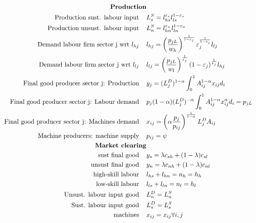 \begin{align}
\text{\textbf{Production}}& \nonumber \\
\text{Production sust. labour input} \hspace{4mm}& L_s^S =l_{hs}^{\varepsilon_s}l_{ls}^{1-\varepsilon_s}\\ 
\text{Production unsust. labour input} \hspace{4mm}& L_n^S =l_{hn}^{\varepsilon_n}l_{ln}^{1-\varepsilon_n}\\
\text{Demand labour firm sector j wrt } l_{hj}\hspace{4mm}&l_{hj}= \left(\frac{p_{jL}}{w_h}\right)^{\frac{1}{1-\varepsilon_j}}\varepsilon_j^{\frac{1}{1-\varepsilon_j}}l_{lj}\\
\text{Demand labour firm sector j wrt } l_{lj}\hspace{4mm}&
l_{lj}= \left(\frac{p_{jL}}{w_l}\right)^\frac{1}{\varepsilon_j}(1-\varepsilon_j)^\frac{1}{\varepsilon_j}l_{hj}\\
\text{Final good producer sector j: Production}\hspace{4mm}&y_j=(L_j^D)^{1-\alpha}\int_{0}^{1}A_{ij}^{1-\alpha}x_{ij}d_i\\
\text{Final good producer sector j: Labour demand}\hspace{4mm}&
p_j(1-\alpha) (L_j^D)^{-\alpha}\int_{0}^{1}A_{ij}^{1-\alpha}x_{ij}^\alpha d_i=p_{jL} %
\\
\text{Final good producer sector j: Machines demand}\hspace{4mm}&
x_{ij} = \left(\alpha\frac{p_j}{p_{ij}}\right)^\frac{1}{1-\alpha}L_j^D A_{ij}\\
\text{Machine producers: machine supply}\hspace{4mm}& p_{ij}=\psi\\
%
\text{\textbf{Market clearing}}& \nonumber\\
\text{sust final good}\hspace{4mm}& y_s=\lambda c_{sh}+(1-\lambda) c_{sl}\\
\text{unsust final good}\hspace{4mm}& y_n=\lambda c_{nh}+(1-\lambda) c_{nl}\\
\text{high-skill labour}\hspace{4mm}& l_{hs}+l_{hn}=n_h=h_h\\
\text{low-skill labour}\hspace{4mm}&l_{ls}+l_{ln}=n_l=h_l\\
\text{Unsust. labour input good}\hspace{4mm}&L_n^D=L_n^S\\
\text{Sust. labour input good}\hspace{4mm}&L_s^D=L_s^S\\
\text{machines}\hspace{4mm}&x_{ij}=x_{ij} \forall i,j
\end{align}
